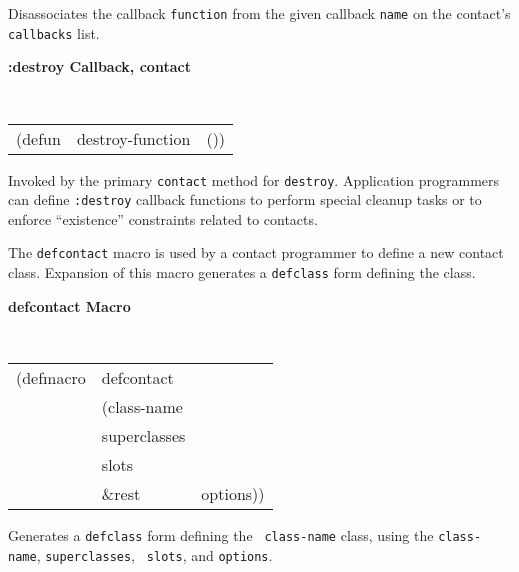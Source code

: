 \documentclass[twoside]{book}
\begin{document}
\begin{sloppy}
\begin{flushright} \parbox[t]{6.125in}{
Disassociates the callback {\tt function} from the given callback {\tt name} on
the contact's {\tt callbacks} list. 

}\end{flushright}



{\samepage
{\large {\bf :destroy \hfill Callback, contact}} 
\begin{flushright} 
\parbox[t]{6.125in}{
\tt
\begin{tabular}{lll}
\raggedright
(defun & destroy-function & ())
\end{tabular}
\rm

}\end{flushright}}

\begin{flushright} \parbox[t]{6.125in}{
Invoked by the primary {\tt contact} method for {\tt destroy}.
Application programmers can define {\tt :destroy} callback functions to
perform special cleanup tasks or to enforce ``existence'' constraints
related to contacts.

}\end{flushright}



The {\tt defcontact} macro is used by a contact programmer to define a
new contact class. Expansion of
this macro generates a {\tt defclass} form defining the class. 

{\samepage
{\large {\bf defcontact \hfill Macro}} 
\begin{flushright} \parbox[t]{6.125in}{
\tt
\begin{tabular}{lll}
\raggedright
(defmacro & defcontact & \\ 
& (class-name\\
& superclasses\\
& slots\\
& \&rest & options))
\end{tabular}
\rm

}\end{flushright}
}

\begin{flushright} 
\parbox[t]{6.125in}{
Generates a {\tt defclass} form defining the {\tt
class-name} class, using the {\tt class-name}, {\tt superclasses}, {\tt
slots}, and {\tt options}. 
}


\end{flushright}
\end{sloppy}
\end{document}
